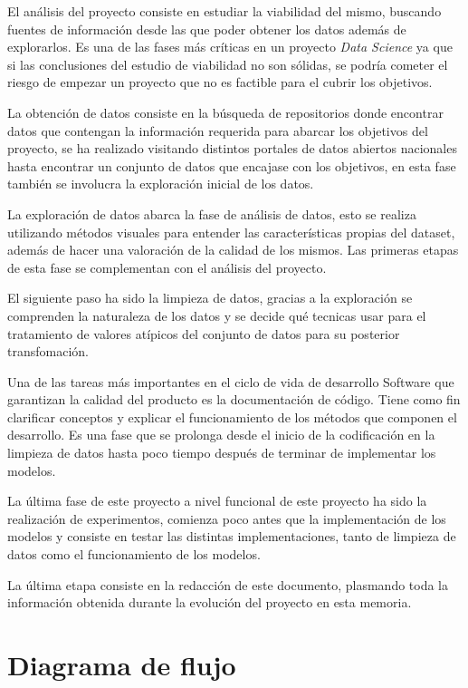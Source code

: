     El análisis del proyecto consiste en estudiar la viabilidad del mismo, buscando fuentes de información desde las que poder obtener los datos además de explorarlos. Es una de las fases más críticas en un proyecto \textit{Data Science} ya que si las conclusiones del estudio de viabilidad no son sólidas, se podría cometer el riesgo de empezar un proyecto que no es factible para el cubrir los objetivos.

    La obtención de datos consiste en la búsqueda de repositorios donde encontrar datos que contengan la información requerida para abarcar los objetivos del proyecto, se ha realizado visitando distintos portales de datos abiertos nacionales hasta encontrar un conjunto de datos que encajase con los objetivos, en esta fase también se involucra la exploración inicial de los datos.

    La exploración de datos abarca la fase de análisis de datos, esto se realiza utilizando métodos visuales para entender las características propias del dataset, además de hacer una valoración de la calidad de los mismos. Las primeras etapas de esta fase se complementan con el análisis del proyecto.

    El siguiente paso ha sido la limpieza de datos, gracias a la exploración se comprenden la naturaleza de los datos y se decide qué tecnicas usar para el tratamiento de valores atípicos del conjunto de datos para su posterior transfomación.

    Una de las tareas más importantes en el ciclo de vida de desarrollo Software que garantizan la calidad del producto es la documentación de código. Tiene como fin
    clarificar conceptos y explicar el funcionamiento de los métodos que componen el desarrollo. Es una fase que se prolonga desde el inicio de la codificación en la limpieza de datos hasta poco tiempo después de terminar de implementar los modelos.

    La última fase de este proyecto a nivel funcional de este proyecto ha sido la realización de experimentos, comienza poco antes que la implementación de los modelos y consiste en testar las distintas implementaciones, tanto de limpieza de datos como el funcionamiento de los modelos.

    La última etapa consiste en la redacción de este documento, plasmando toda la información obtenida durante la evolución del proyecto en esta memoria.



\section{Diagrama de flujo}

